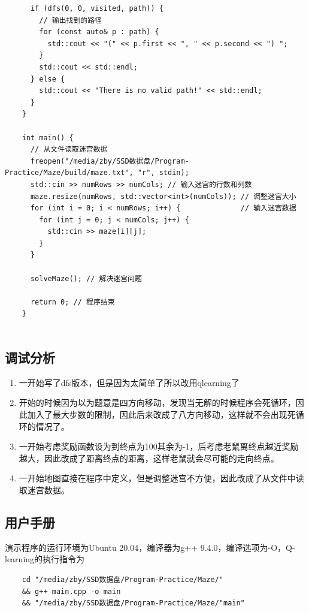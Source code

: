 \documentclass[UTF8,titlepage]{ctexart}
\numberwithin{figure}{section}
\begin{document}
\begin{verbatim}
      if (dfs(0, 0, visited, path)) {
        // 输出找到的路径
        for (const auto& p : path) {
          std::cout << "(" << p.first << ", " << p.second << ") ";
        }
        std::cout << std::endl;
      } else {
        std::cout << "There is no valid path!" << std::endl;
      }
    }
    
    int main() {
      // 从文件读取迷宫数据
      freopen("/media/zby/SSD数据盘/Program-Practice/Maze/build/maze.txt", "r", stdin);
      std::cin >> numRows >> numCols; // 输入迷宫的行数和列数
      maze.resize(numRows, std::vector<int>(numCols)); // 调整迷宫大小
      for (int i = 0; i < numRows; i++) {              // 输入迷宫数据
        for (int j = 0; j < numCols; j++) {
          std::cin >> maze[i][j];
        }
      }
    
      solveMaze(); // 解决迷宫问题
    
      return 0; // 程序结束
    }
    
\end{verbatim}
\subsection{调试分析}
\begin{enumerate}
    \item 一开始写了dfs版本，但是因为太简单了所以改用qlearning了
    \item 开始的时候因为以为题意是四方向移动，发现当无解的时候程序会死循环，因此加入了最大步数的限制，因此后来改成了八方向移动，这样就不会出现死循环的情况了。
    \item 一开始考虑奖励函数设为到终点为100其余为-1，后考虑老鼠离终点越近奖励越大，因此改成了距离终点的距离，这样老鼠就会尽可能的走向终点。
    \item 一开始地图直接在程序中定义，但是调整迷宫不方便，因此改成了从文件中读取迷宫数据。
\end{enumerate}

\subsection{用户手册}
演示程序的运行环境为Ubuntu 20.04，编译器为g++ 9.4.0，编译选项为-O，Q-learning的执行指令为
\begin{verbatim}
    cd "/media/zby/SSD数据盘/Program-Practice/Maze/" 
    && g++ main.cpp -o main 
    && "/media/zby/SSD数据盘/Program-Practice/Maze/"main"
\end{verbatim}
\end{document}
